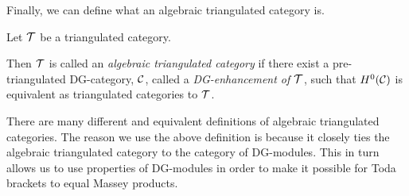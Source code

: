 Finally, we can define what an algebraic triangulated category is.
\begin{definition}
    \label{def:alg_tri_cat}
    Let \( {\mathcal{T}} \) be a triangulated category.

    Then \( {\mathcal{T}} \) is called an \emph{algebraic triangulated category} if there exist a pre-triangulated DG-category, \( {\mathcal{C}} \), called a \emph{DG-enhancement of \( {\mathcal{T}} \)}, such that \( H^0({\mathcal{C}}) \) is equivalent as triangulated categories to \( {\mathcal{T}} \).
\end{definition}

There are many different and equivalent definitions of algebraic triangulated categories. The reason we use the above definition is because it closely ties the algebraic triangulated category to the category of DG-modules. This in turn allows us to use properties of DG-modules in order to make it possible for Toda brackets to equal Massey products.

